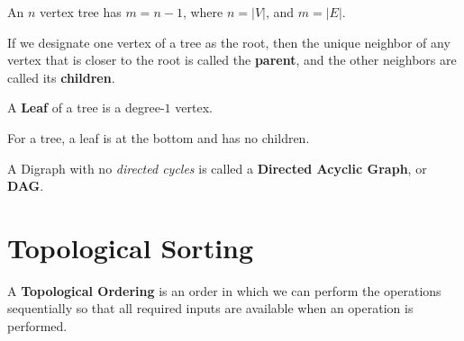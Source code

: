 \documentclass[12pt]{article}
\begin{document}
  An $n$ vertex tree has $m = n - 1$, where $n = |V|$, and $m = |E|$.

   {
    If we designate one vertex of a tree as the root, then the unique neighbor of
    any vertex that is closer to the root is called the {\bf parent}, and the
    other neighbors are called its {\bf children}.
  }

   {
    A {\bf Leaf} of a tree is a degree-$1$ vertex.

    For a tree, a leaf is at the bottom and has no children.
  }

   {
    A Digraph with no {\it directed cycles} is called a {\bf Directed Acyclic
    Graph}, or {\bf DAG}.
  }





  \newpage

  \section{Topological Sorting}

   {
    A {\bf Topological Ordering} is an order in which we can perform the
    operations sequentially so that all required inputs are available when an
    operation is performed.
  }

\end{document}
